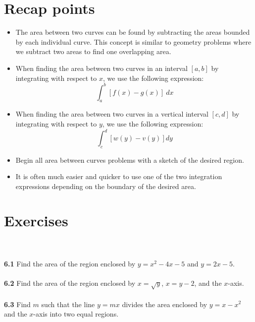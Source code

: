 \documentclass[11pt]{scrartcl}
\begin{document}
\section{Recap points}
\begin{itemize}
    \item The area between two curves can be found by subtracting the areas bounded by each individual curve. This concept is similar to geometry problems where we subtract two areas to find one overlapping area. 
    \item When finding the area between two curves in an interval $[a,b]$ by integrating with respect to $x$, we use the following expression: 
    $$\int_a^b [f(x)-g(x)] \ dx$$
    \item When finding the area between two curves in a vertical interval $[c,d]$ by integrating with respect to $y$, we use the following expression: 
    $$\int_c^d[w(y)-v(y)]dy$$
    \item Begin all area between curves problems with a sketch of the desired region. 
    \item It is often much easier and quicker to use one of the two integration expressions depending on the boundary of the desired area. 
\end{itemize}
\section{Exercises}\\
\\
\noindent 
\textbf{6.1} Find the area of the region enclosed by $y=x^2-4x-5$ and $y=2x-5$. \\
\\
\noindent 
\textbf{6.2} Find the area of the region enclosed by $x=\sqrt{y}$, $x=y-2$, and the $x$-axis.  \\
\\
\noindent 
\textbf{6.3} Find $m$ such that the line $y=mx$ divides the area enclosed by $y=x-x^2$ and the $x$-axis into two equal regions. 
\end{document}
